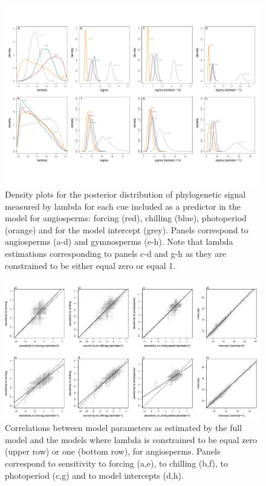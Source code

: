 \documentclass{article}\usepackage[]{graphicx}\usepackage[]{color}
\begin{document}
\begin{figure} [H]
  \begin{center}
  \includegraphics[width=14cm]{../../analyses/phylogeny/figures/Fig2_lambdas_sigmas.pdf}
  \caption{Density plots for the posterior distribution of phylogenetic signal measured by lambda for each cue included as a predictor in the model for angiosperms: forcing (red), chilling (blue),  photoperiod (orange) and for the model intercept (grey). Panels correspond to angiosperms (a-d) and gymnosperms (e-h). Note that lambda estimations corresponding to  panels c-d and g-h as they are constrained to be either equal zero or equal 1.}
  \label{fig:phylosig_all}
  \end{center}
\end{figure}

\begin{figure} [H]
  \begin{center}
  \includegraphics[width=14cm]{../../analyses/phylogeny/figures/Est_correls_vs_lamb01_angio.pdf}
  \caption{Correlations between model parameters as estimated by the full model and the models where lambda is constrained to be equal zero (upper row) or one (bottom row), for angiosperms. Panels correspond to sensitivity to forcing (a,e), to chilling (b,f), to photoperiod (c,g) and to model intercepts (d,h).}
  \label{fig:correls_angio}
  \end{center}
\end{figure}
\end{document}
